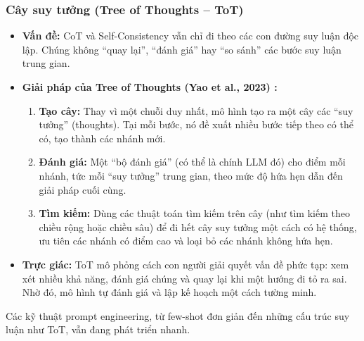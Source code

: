 \subsubsection{Cây suy tưởng (Tree of Thoughts -- ToT)}
\begin{itemize}
    \item \textbf{Vấn đề:} CoT và Self-Consistency vẫn chỉ đi theo các con đường suy luận độc lập. Chúng không “quay lại”, “đánh giá” hay “so sánh” các bước suy luận trung gian.
    \item \textbf{Giải pháp của Tree of Thoughts (Yao et al., 2023) \cite{yao2023tree}:}
        \begin{enumerate}
            \item \textbf{Tạo cây:} Thay vì một chuỗi duy nhất, mô hình tạo ra một cây các “suy tưởng” (thoughts). Tại mỗi bước, nó đề xuất nhiều bước tiếp theo có thể có, tạo thành các nhánh mới.
            \item \textbf{Đánh giá:} Một “bộ đánh giá” (có thể là chính LLM đó) cho điểm mỗi nhánh, tức mỗi “suy tưởng” trung gian, theo mức độ hứa hẹn dẫn đến giải pháp cuối cùng.
            \item \textbf{Tìm kiếm:} Dùng các thuật toán tìm kiếm trên cây (như tìm kiếm theo chiều rộng hoặc chiều sâu) để đi hết cây suy tưởng một cách có hệ thống, ưu tiên các nhánh có điểm cao và loại bỏ các nhánh không hứa hẹn.
        \end{enumerate}
    \item \textbf{Trực giác:} ToT mô phỏng cách con người giải quyết vấn đề phức tạp: xem xét nhiều khả năng, đánh giá chúng và quay lại khi một hướng đi tỏ ra sai. Nhờ đó, mô hình tự đánh giá và lập kế hoạch một cách tường minh.
\end{itemize}

Các kỹ thuật prompt engineering, từ few-shot đơn giản đến những cấu trúc suy luận như ToT, vẫn đang phát triển nhanh.